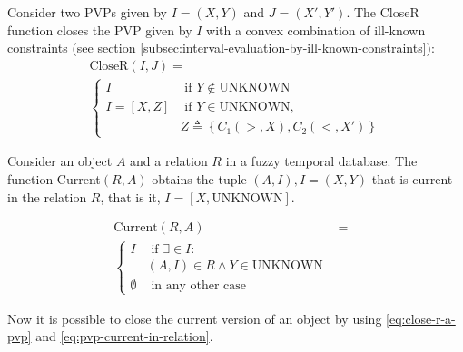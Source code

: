 \begin{definition}
\label{def:close-r-a-pvp}
Consider two PVPs given by $I = \left(X, Y \right)$ and $J = \left(X', Y' \right)$. The CloseR function closes the PVP given by $I$ with a convex combination of ill-known constraints (see section \ref{subsec:interval-evaluation-by-ill-known-constraints}):
\begin{align}
\label{eq:close-r-a-pvp}
\text{CloseR}\left(I, J\right) = \\
\begin{cases}
\nonumber
I   & \mbox{ if } Y \not \in \text{UNKNOWN}  \\
I = \left[X, Z \right] & \mbox{ if } Y \in \text{UNKNOWN}, \\
& Z \triangleq \left \lbrace C_1\left(>, X \right), C_2\left(<, X' \right) \right \rbrace
\end{cases}
\end{align}
\end{definition}

\begin{definition}
\label{def:pvp-current-in-relation}
Consider an object $A$ and a relation $R$ in a fuzzy temporal database. The function Current$\left(R, A \right)$ obtains the tuple $\left(A, I \right), I = \left(X, Y \right)$ that is current in the relation $R$, that is it, $I = \left[X , \text{UNKNOWN} \right]$.

\begin{align}
\label{eq:pvp-current-in-relation}
\mbox{Current} \left(R, A \right) &=& \\ 
\begin{cases}
\nonumber
I & \mbox{ if } \exists  \in I : \\
&  (A,I) \in R \wedge Y \in \text{UNKNOWN}\\
\emptyset & \mbox{ in any other case }
\end{cases}
\end{align}
\end{definition}

Now it is possible to close the current version of an object by using \eqref{eq:close-r-a-pvp} and \eqref{eq:pvp-current-in-relation}.

